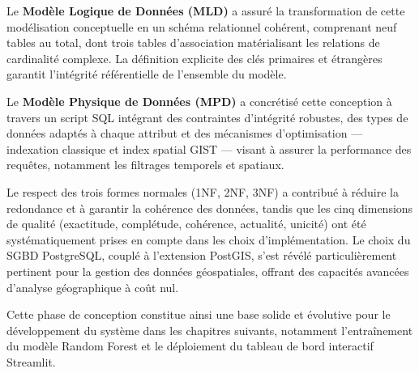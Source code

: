\documentclass[12pt,a4paper]{report}
\begin{document}
Le \textbf{Modèle Logique de Données (MLD)} a assuré la transformation de cette modélisation conceptuelle en un schéma relationnel cohérent, comprenant neuf tables au total, dont trois tables d'association matérialisant les relations de cardinalité complexe. La définition explicite des clés primaires et étrangères garantit l'intégrité référentielle de l'ensemble du modèle.

Le \textbf{Modèle Physique de Données (MPD)} a concrétisé cette conception à travers un script SQL intégrant des contraintes d'intégrité robustes, des types de données adaptés à chaque attribut et des mécanismes d'optimisation --- indexation classique et index spatial GIST --- visant à assurer la performance des requêtes, notamment les filtrages temporels et spatiaux.

Le respect des trois formes normales (1NF, 2NF, 3NF) a contribué à réduire la redondance et à garantir la cohérence des données, tandis que les cinq dimensions de qualité (exactitude, complétude, cohérence, actualité, unicité) ont été systématiquement prises en compte dans les choix d'implémentation. Le choix du SGBD PostgreSQL, couplé à l'extension PostGIS, s'est révélé particulièrement pertinent pour la gestion des données géospatiales, offrant des capacités avancées d'analyse géographique à coût nul.

Cette phase de conception constitue ainsi une base solide et évolutive pour le développement du système dans les chapitres suivants, notamment l'entraînement du modèle Random Forest et le déploiement du tableau de bord interactif Streamlit.
\end{document}
